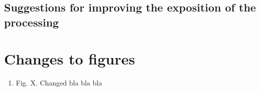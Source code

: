 \documentclass[11pt]{article} %
\newcommand\1{\vec 1}
\begin{document}
\subsection*{Suggestions for improving the exposition of the processing}



\newpage
\section{Changes to figures}

\begin{enumerate}
\item Fig. X. Changed bla bla bla
\end{enumerate}


% 
% 
% 
% 
% 
% 
% 
\end{document}
